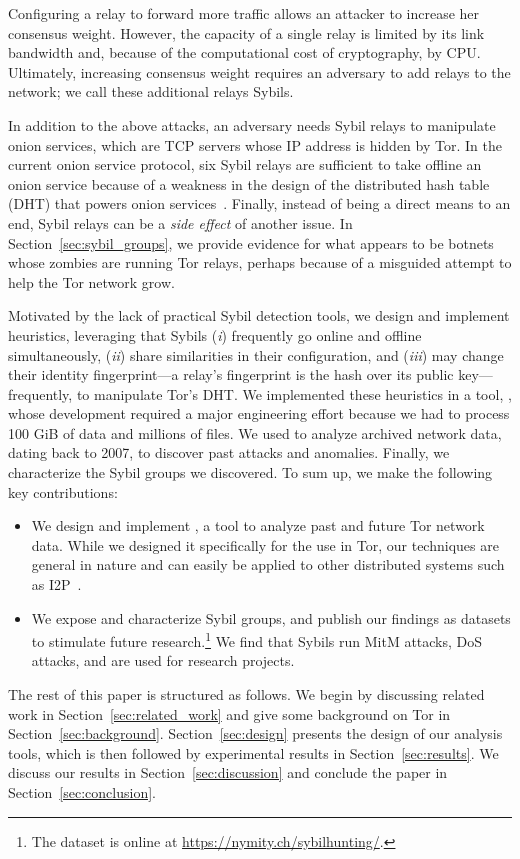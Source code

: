 Configuring a relay to forward more traffic allows an attacker to increase her
consensus weight.  However, the capacity of a single relay is limited by its
link bandwidth and, because of the computational cost of cryptography, by CPU.
Ultimately, increasing consensus weight requires an adversary to add relays to
the network; we call these additional relays Sybils.

In addition to the above attacks, an adversary needs Sybil relays to manipulate
onion services, which are TCP servers whose IP address is hidden by Tor.  In the
current onion service protocol, six Sybil relays are sufficient to take offline
an onion service because of a weakness in the design of the distributed hash
table (DHT) that powers onion services~\cite{Biryukov2013a}.  Finally, instead
of being a direct means to an end, Sybil relays can be a \emph{side effect} of
another issue.  In Section~\ref{sec:sybil_groups}, we provide evidence for what
appears to be botnets whose zombies are running Tor relays, perhaps because of a
misguided attempt to help the Tor network grow.

Motivated by the lack of practical Sybil detection tools, we design and
implement heuristics, leveraging that Sybils (\emph{i}) frequently go online and
offline simultaneously, (\emph{ii}) share similarities in their configuration,
and (\emph{iii}) may change their identity fingerprint---a relay's fingerprint
is the hash over its public key---frequently, to manipulate Tor's DHT.  We
implemented these heuristics in a tool, \sys, whose development required a major
engineering effort because we had to process 100 GiB of data and millions of
files.  We used \sys to analyze archived network data, dating back to 2007, to
discover past attacks and anomalies.  Finally, we characterize the Sybil groups
we discovered.  To sum up, we make the following key contributions:
\begin{itemize}
	\item We design and implement \sys, a tool to analyze past and future Tor
		network data.  While we designed it specifically for the use in Tor, our
		techniques are general in nature and can easily be applied to other
		distributed systems such as I2P~\cite{i2p}.
	\item We expose and characterize Sybil groups, and publish our findings as
		datasets to stimulate future research.\footnote{The dataset is online at
			\url{https://nymity.ch/sybilhunting/}.} We find that Sybils run MitM
		attacks, DoS attacks, and are used for research projects.
\end{itemize}

The rest of this paper is structured as follows.  We begin by discussing related
work in Section~\ref{sec:related_work} and give some background on Tor in
Section~\ref{sec:background}.  Section~\ref{sec:design} presents the design of
our analysis tools, which is then followed by experimental results in
Section~\ref{sec:results}.  We discuss our results in
Section~\ref{sec:discussion} and conclude the paper in
Section~\ref{sec:conclusion}.
